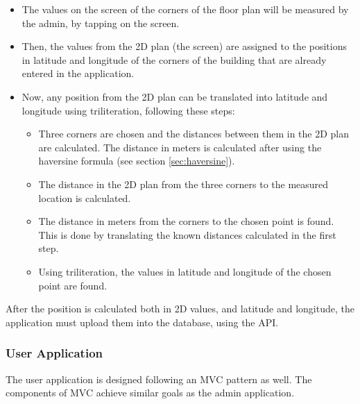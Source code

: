 \begin{itemize}
    \item The values on the screen of the corners of the floor plan will be measured by the admin, by tapping on the screen.
    \item Then, the values from the 2D plan (the screen) are assigned to the positions in latitude and longitude of the corners of the building that are already entered in the application.
    \item Now, any position from the 2D plan can be translated into latitude and longitude using triliteration, following these steps:
    \begin{itemize}
        \item Three corners are chosen and the distances between them in the 2D plan are calculated. The distance in meters is calculated after using the haversine formula (see section \ref{sec:haversine}).
        \item The distance in the 2D plan from the three corners to the measured location is calculated.
        \item The distance in meters from the corners to the chosen point is found. This is done by translating the known distances calculated in the first step.
        \item Using triliteration, the values in latitude and longitude of the chosen point are found.
    \end{itemize}
\end{itemize}

After the position is calculated both in 2D values, and latitude and longitude, the application must upload them into the database, using the API.

\subsubsection{User Application}
The user application is designed following an MVC pattern as well. The components of MVC achieve similar goals as the admin application. 

